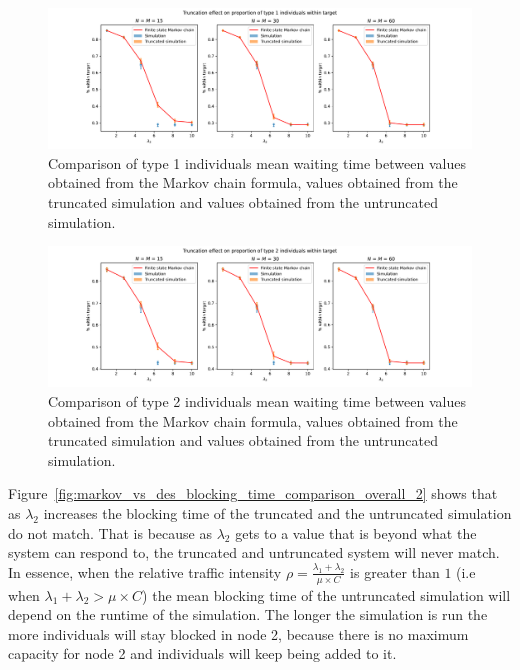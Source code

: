 \begin{figure}[H]
    \includegraphics[width=\textwidth]{chapters/03_queueing_model/Bin/numeric_results_and_timings/truncation_effect_2/proportion_type_1.pdf}
    \caption{
        Comparison of type 1 individuals mean waiting time between values
        obtained from the Markov chain formula, values obtained from the
        truncated simulation and values obtained from the untruncated
        simulation.
    }
    \label{fig:markov_vs_des_proportion_within_time_comparison_type_1_2}
\end{figure}

\begin{figure}[H]
    \includegraphics[width=\textwidth]{chapters/03_queueing_model/Bin/numeric_results_and_timings/truncation_effect_2/proportion_type_2.pdf}
    \caption{
        Comparison of type 2 individuals mean waiting time between values
        obtained from the Markov chain formula, values obtained from the
        truncated simulation and values obtained from the untruncated
        simulation.
    }
    \label{fig:markov_vs_des_proportion_within_time_comparison_type_2_2}
\end{figure}


Figure~\ref{fig:markov_vs_des_blocking_time_comparison_overall_2} shows that as
\(\lambda_2\) increases the blocking time of the truncated and the untruncated
simulation do not match.
That is because as \(\lambda_2\) gets to a value that is beyond what the system
can respond to, the truncated and untruncated system will never match.
In essence, when the relative traffic intensity
\(\rho = \frac{\lambda_1 + \lambda_2}{\mu \times C}\) is greater than \(1\) (i.e
when \(\lambda_1 + \lambda_2 > \mu \times C\)) the mean blocking time of the
untruncated simulation will depend on the runtime of the simulation.
The longer the simulation is run the more individuals will stay blocked in
node 2, because there is no maximum capacity for node 2 and individuals will
keep being added to it.
